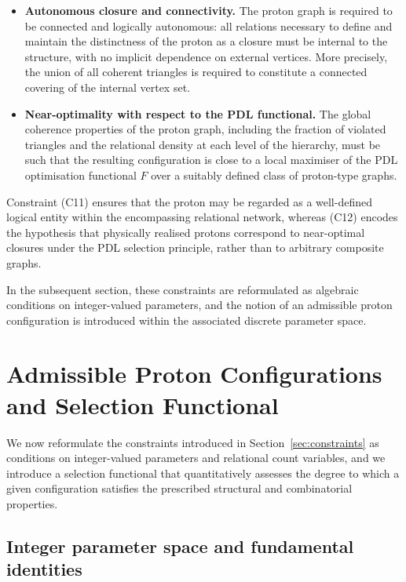 \documentclass[11pt,a4paper]{article}
\theoremstyle{definition}
\begin{document}
\begin{itemize}
  \item[(C11)] \textbf{Autonomous closure and connectivity.} The proton graph is required to be connected and logically autonomous: all relations necessary to define and maintain the distinctness of the proton as a closure must be internal to the structure, with no implicit dependence on external vertices. More precisely, the union of all coherent triangles is required to constitute a connected covering of the internal vertex set.\cite{PDL_Main_2026,PDL_Global_Mapping_2026}
  \item[(C12)] \textbf{Near-optimality with respect to the PDL functional.} The global coherence properties of the proton graph, including the fraction of violated triangles and the relational density at each level of the hierarchy, must be such that the resulting configuration is close to a local maximiser of the PDL optimisation functional $F$ over a suitably defined class of proton-type graphs.\cite{PDL_Main_2026,PDL_Global_Mapping_2026}
\end{itemize}

Constraint (C11) ensures that the proton may be regarded as a well-defined logical entity within the encompassing relational network, whereas (C12) encodes the hypothesis that physically realised protons correspond to near-optimal closures under the PDL selection principle, rather than to arbitrary composite graphs.

In the subsequent section, these constraints are reformulated as algebraic conditions on integer-valued parameters, and the notion of an admissible proton configuration is introduced within the associated discrete parameter space.\cite{Combinatorial_Proton_v2_2026}

\section{Admissible Proton Configurations and Selection Functional}
\label{sec:admissible_selection}

We now reformulate the constraints introduced in Section~\ref{sec:constraints} as conditions on integer-valued parameters and relational count variables, and we introduce a selection functional that quantitatively assesses the degree to which a given configuration satisfies the prescribed structural and combinatorial properties.\cite{Combinatorial_Proton_v2_2026,PDL_Global_Mapping_2026}

\subsection{Integer parameter space and fundamental identities}
\end{document}
